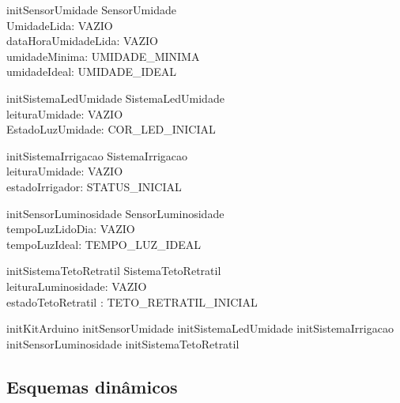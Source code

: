 		\begin{schema}{initSensorUmidade}
			\Delta SensorUmidade \\
        \where
			UmidadeLida: VAZIO\\
            dataHoraUmidadeLida: VAZIO\\
			umidadeMinima: UMIDADE\_MINIMA \\
			umidadeIdeal: UMIDADE\_IDEAL \\   
		\end{schema}

		\begin{schema}{initSistemaLedUmidade}
			\Delta SistemaLedUmidade \\
        \where
			leituraUmidade: VAZIO \\ 
			EstadoLuzUmidade: COR\_LED\_INICIAL \\
		\end{schema}

		\begin{schema}{initSistemaIrrigacao}
			\Delta SistemaIrrigacao \\
        \where
			leituraUmidade: VAZIO \\ 
			estadoIrrigador: STATUS\_INICIAL \\ 
		\end{schema}

		\begin{schema}{initSensorLuminosidade}
			\Delta SensorLuminosidade \\
            \where
			tempoLuzLidoDia: VAZIO \\ 
			tempoLuzIdeal: TEMPO\_LUZ\_IDEAL \\   
		\end{schema}

		\begin{schema}{initSistemaTetoRetratil}
			\Delta SistemaTetoRetratil \\
        \where
			leituraLuminosidade: VAZIO \\ 
			estadoTetoRetratil : TETO\_RETRATIL\_INICIAL \\ 
		\end{schema}

		\begin{schema}{initKitArduino}
			initSensorUmidade \land 
			initSistemaLedUmidade \land 
			initSistemaIrrigacao \land \\
			initSensorLuminosidade \land 
			initSistemaTetoRetratil 
		\end{schema}


        \subsection{Esquemas dinâmicos}
            
